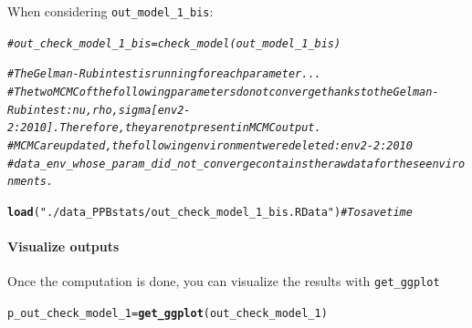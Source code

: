 \documentclass{book}\usepackage[]{graphicx}\usepackage[]{color}
\makeatletter
\newcommand{\hlstr}[1]{\textcolor[rgb]{0.192,0.494,0.8}{#1}}%
\newcommand{\hlcom}[1]{\textcolor[rgb]{0.678,0.584,0.686}{\textit{#1}}}%
\newcommand{\hlstd}[1]{\textcolor[rgb]{0.345,0.345,0.345}{#1}}%
\newcommand{\hlkwb}[1]{\textcolor[rgb]{0.69,0.353,0.396}{#1}}%
\newcommand{\hlkwd}[1]{\textcolor[rgb]{0.737,0.353,0.396}{\textbf{#1}}}%
\newenvironment{kframe}{%
 \def\at@end@of@kframe{}%
 \ifinner\ifhmode%
  \def\at@end@of@kframe{\end{minipage}}%
  \begin{minipage}{\columnwidth}%
 \fi\fi%
 \def\FrameCommand##1{\hskip\@totalleftmargin \hskip-\fboxsep
 \colorbox{shadecolor}{##1}\hskip-\fboxsep
     \hskip-\linewidth \hskip-\@totalleftmargin \hskip\columnwidth}%
 \MakeFramed {\advance\hsize-\width
   \@totalleftmargin\z@ \linewidth\hsize
   \@setminipage}}%
 {\par\unskip\endMakeFramed%
 \at@end@of@kframe}
\newenvironment{knitrout}{}{} %
\makeatother
\begin{document}
When considering \texttt{out\_model\_1\_bis}:
\begin{knitrout}
\color{fgcolor}\begin{kframe}
\begin{alltt}
\hlcom{# out_check_model_1_bis = check_model(out_model_1_bis)}

\hlcom{# The Gelman-Rubin test is running for each parameter ...}
\hlcom{# The two MCMC of the following parameters do not converge thanks to the Gelman-Rubin test : nu, rho, sigma[env2-2:2010]. Therefore, they are not present in MCMC output.}
\hlcom{# MCMC are updated, the following environment were deleted : env2-2:2010}
\hlcom{# data_env_whose_param_did_not_converge contains the raw data for these environments.}

\hlkwd{load}\hlstd{(}\hlstr{"./data_PPBstats/out_check_model_1_bis.RData"}\hlstd{)} \hlcom{# To save time}
\end{alltt}
\end{kframe}
\end{knitrout}


\paragraph{Visualize outputs}

Once the computation is done, you can visualize the results with \texttt{get\_ggplot}
\begin{knitrout}
\color{fgcolor}\begin{kframe}
\begin{alltt}
\hlstd{p_out_check_model_1} \hlkwb{=} \hlkwd{get_ggplot}\hlstd{(out_check_model_1)}
\end{alltt}


{\ttfamily\noindent\itshape\color{messagecolor}{\#\# Distribution of sigma\_j in the inverse Gamme distribution are done.}}

{\ttfamily\noindent\itshape\color{messagecolor}{\#\# The mu\_ij posterior distributions are done.}}

{\ttfamily\noindent\itshape\color{messagecolor}{\#\# The beta\_jk posterior distributions are done.}}

{\ttfamily\noindent\itshape\color{messagecolor}{\#\# The sigma\_j posterior distributions are done.}}

{\ttfamily\noindent\itshape\color{messagecolor}{\#\# The standardised residuals distributions are done.}}\end{kframe}
\end{knitrout}
\end{document}
